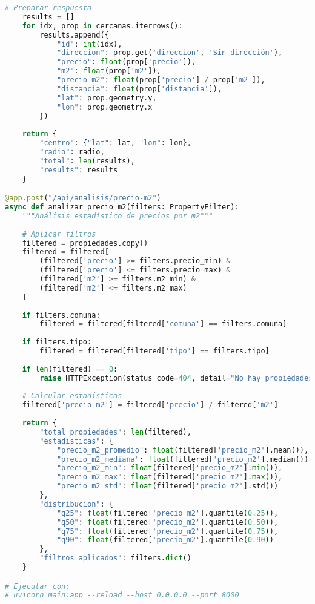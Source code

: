 \documentclass[11pt,a4paper]{article}
\begin{document}
\begin{lstlisting}[language=Python]
    # Preparar respuesta
    results = []
    for idx, prop in cercanas.iterrows():
        results.append({
            "id": int(idx),
            "direccion": prop.get('direccion', 'Sin dirección'),
            "precio": float(prop['precio']),
            "m2": float(prop['m2']),
            "precio_m2": float(prop['precio'] / prop['m2']),
            "distancia": float(prop['distancia']),
            "lat": prop.geometry.y,
            "lon": prop.geometry.x
        })
    
    return {
        "centro": {"lat": lat, "lon": lon},
        "radio": radio,
        "total": len(results),
        "results": results
    }

@app.post("/api/analisis/precio-m2")
async def analizar_precio_m2(filters: PropertyFilter):
    """Análisis estadístico de precios por m2"""
    
    # Aplicar filtros
    filtered = propiedades.copy()
    filtered = filtered[
        (filtered['precio'] >= filters.precio_min) &
        (filtered['precio'] <= filters.precio_max) &
        (filtered['m2'] >= filters.m2_min) &
        (filtered['m2'] <= filters.m2_max)
    ]
    
    if filters.comuna:
        filtered = filtered[filtered['comuna'] == filters.comuna]
    
    if filters.tipo:
        filtered = filtered[filtered['tipo'] == filters.tipo]
    
    if len(filtered) == 0:
        raise HTTPException(status_code=404, detail="No hay propiedades con esos filtros")
    
    # Calcular estadísticas
    filtered['precio_m2'] = filtered['precio'] / filtered['m2']
    
    return {
        "total_propiedades": len(filtered),
        "estadisticas": {
            "precio_m2_promedio": float(filtered['precio_m2'].mean()),
            "precio_m2_mediana": float(filtered['precio_m2'].median()),
            "precio_m2_min": float(filtered['precio_m2'].min()),
            "precio_m2_max": float(filtered['precio_m2'].max()),
            "precio_m2_std": float(filtered['precio_m2'].std())
        },
        "distribucion": {
            "q25": float(filtered['precio_m2'].quantile(0.25)),
            "q50": float(filtered['precio_m2'].quantile(0.50)),
            "q75": float(filtered['precio_m2'].quantile(0.75)),
            "q90": float(filtered['precio_m2'].quantile(0.90))
        },
        "filtros_aplicados": filters.dict()
    }

# Ejecutar con:
# uvicorn main:app --reload --host 0.0.0.0 --port 8000
\end{lstlisting}
\end{document}
